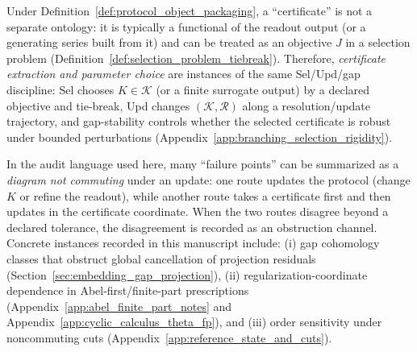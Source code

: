 \begin{remark}\label{rem:certificates_as_sel_objectives_unified_spine}
\AuditTag Under Definition~\ref{def:protocol_object_packaging}, a ``certificate'' is not a separate ontology: it is typically a functional of the readout output (or a generating series built from it) and can be treated as an objective $J$ in a selection problem (Definition~\ref{def:selection_problem_tiebreak}).
Therefore, \emph{certificate extraction and parameter choice} are instances of the same Sel/Upd/gap discipline:
Sel chooses $K\in\mathcal{K}$ (or a finite surrogate output) by a declared objective and tie-break,
Upd changes $(\mathcal{K},\mathcal{R})$ along a resolution/update trajectory,
and gap-stability controls whether the selected certificate is robust under bounded perturbations (Appendix~\ref{app:branching_selection_rigidity}).
\end{remark}

\begin{remark}\label{rem:obstruction_as_noncommuting_diagram}
\AuditTag In the audit language used here, many ``failure points'' can be summarized as a \emph{diagram not commuting} under an update:
one route updates the protocol (change $K$ or refine the readout), while another route takes a certificate first and then updates in the certificate coordinate.
When the two routes disagree beyond a declared tolerance, the disagreement is recorded as an obstruction channel.
Concrete instances recorded in this manuscript include:
(i) gap cohomology classes that obstruct global cancellation of projection residuals (Section~\ref{sec:embedding_gap_projection}),
(ii) regularization-coordinate dependence in Abel-first/finite-part prescriptions (Appendix~\ref{app:abel_finite_part_notes} and Appendix~\ref{app:cyclic_calculus_theta_fp}),
and (iii) order sensitivity under noncommuting cuts (Appendix~\ref{app:reference_state_and_cuts}).
\end{remark}

